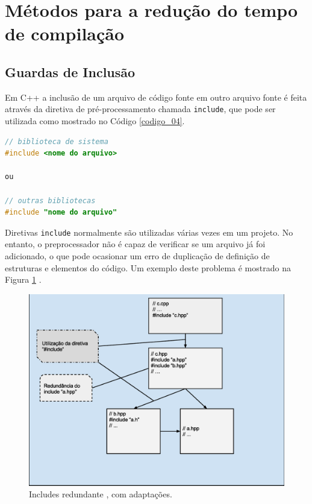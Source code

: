 \section{Métodos para a redução do tempo de compilação}

\subsection{Guardas de Inclusão}\label{include_guards_section}

Em C++ a inclusão de um arquivo de código fonte em outro arquivo fonte é feita
 através da diretiva de pré-processamento chamada \texttt{include}, que pode 
ser utilizada como mostrado no Código \ref{codigo_04}. 

\begin{lstlisting}[language=C++,caption={Diretiva de 
                           pré-processamento para inclusão de arquivo},
                                                   label=codigo_04]
// biblioteca de sistema 
#include <nome do arquivo>  

ou

// outras bibliotecas 
#include "nome do arquivo"  

\end{lstlisting}


Diretivas \texttt{include} normalmente são utilizadas várias vezes em um projeto.
 No entanto, o preprocessador não é capaz de verificar se um arquivo já foi
 adicionado, o que pode ocasionar um erro de duplicação de definição de
 estruturas e elementos do código. Um exemplo deste problema é mostrado na
 Figura \ref{fig07} \cite[pág. 57]{ref39}.

\begin{figure}[h]
    \centering
        \includegraphics[keepaspectratio=true,scale=0.55]{figuras/multi_include.eps}
    \caption{Includes redundante \cite[pág.  80]{ref42}, com adaptações.}
    \label{fig07}
\end{figure}

